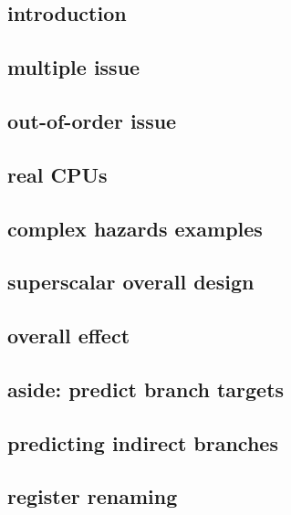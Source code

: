 
\subsection{introduction}

\subsection{multiple issue}


\subsection{out-of-order issue}


\subsection{real CPUs}


\subsection{complex hazards examples}

\subsection{superscalar overall design}



\subsection{overall effect}


\subsection{aside: predict branch targets}

\subsection{predicting indirect branches}


\subsection{register renaming}

